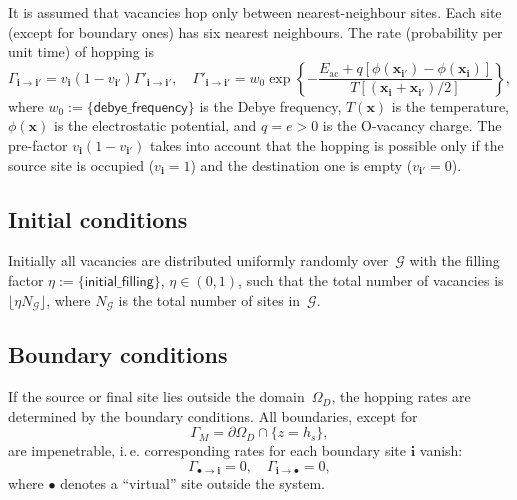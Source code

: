 \documentclass[10pt]{article}
\renewcommand{\vec}[1]{\mathbf{#1}}
\newcommand{\vi}{\vec{i}}
\newcommand{\vx}{\vec{x}}
\begin{document}
It is assumed that vacancies hop only between nearest-neighbour sites. Each site
(except for boundary ones) has six nearest neighbours. The rate (probability per
unit time) of hopping is
\begin{equation}
	\Gamma_{\vi \to \vi'} = v_\vi (1 - v_{\vi'}) \Gamma'_{\vi \to \vi'},
	\quad
	\Gamma'_{\vi \to \vi'} = w_0 \exp \left\{
	-\frac{E_{\mathrm{ac}} + q[\phi(\vx_{\vi'}) - \phi(\vx_\vi)]}
	{T[(\vx_\vi + \vx_{\vi'}) / 2]} \right\},
\end{equation}
where $w_0 := \{ \mathsf{debye\_frequency} \}$ is the Debye frequency, $T(\vx)$
is the temperature, $\phi(\vx)$ is the electrostatic potential, and $q = e > 0$
is the O-vacancy charge. The pre-factor $v_\vi (1 - v_{\vi'})$ takes into account
that the hopping is possible only if the source site is occupied ($v_\vi = 1$)
and the destination one is empty ($v_{\vi'} = 0$).

\subsection{Initial conditions}

Initially all vacancies are distributed uniformly randomly over~$\mathcal{G}$
with the filling factor $\eta := \{ \mathsf{initial\_filling} \}$,
$\eta \in (0, 1)$, such that the total number of vacancies is
$\lfloor \eta N_{\mathcal{G}} \rfloor$, where $N_{\mathcal{G}}$ is the total
number of sites in~$\mathcal{G}$.

\subsection{Boundary conditions}

If the source or final site lies outside the domain~$\Omega_D$, the hopping
rates are determined by the boundary conditions. All boundaries, except for
\begin{equation}
	\Gamma_M = \partial\Omega_D \cap \{ z = h_s \},
\end{equation}
are impenetrable, i.\,e. corresponding rates for each boundary site $\vi$ vanish:
\begin{equation}
	\Gamma_{\bullet \to \vi} = 0, \quad
	\Gamma_{\vi \to \bullet} = 0,
\end{equation}
where $\bullet$ denotes a ``virtual'' site outside the system.
\end{document}
